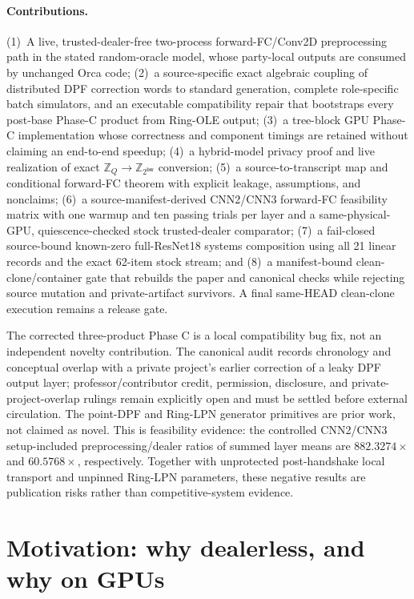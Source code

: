 \documentclass[11pt]{article}
\newcommand{\Z}{\mathbb{Z}}
\newcommand{\bw}{\mathsf{bw}}
\begin{document}
\paragraph{Contributions.}
(1)~A live, trusted-dealer-free two-process forward-FC/Conv2D preprocessing
path in the stated random-oracle model, whose party-local outputs are consumed
by unchanged Orca code;
(2)~a source-specific exact algebraic coupling of distributed DPF correction
words to standard generation, complete role-specific batch simulators, and an
executable compatibility repair that bootstraps every post-base Phase-C product
from Ring-OLE output;
(3)~a tree-block GPU Phase-C implementation whose correctness and component
timings are retained without claiming an end-to-end speedup;
(4)~a hybrid-model privacy proof and live realization of exact
$\Z_Q\to\Z_{2^\bw}$ conversion;
(5)~a source-to-transcript map and conditional forward-FC theorem with explicit
leakage, assumptions, and nonclaims;
(6)~a source-manifest-derived CNN2/CNN3 forward-FC feasibility matrix with one
warmup and ten passing trials per layer and a same-physical-GPU,
quiescence-checked stock trusted-dealer comparator;
(7)~a fail-closed source-bound known-zero full-ResNet18 systems composition
using all 21 linear records and the exact 62-item stock stream; and
(8)~a manifest-bound clean-clone/container gate that rebuilds the paper and
canonical checks while rejecting source mutation and private-artifact
survivors. A final same-HEAD clean-clone execution remains a release gate.

The corrected three-product Phase C is a local compatibility bug fix, not an
independent novelty contribution. The canonical audit records chronology and
conceptual overlap with a private project's earlier correction of a leaky DPF
output layer; professor/contributor credit, permission, disclosure, and
private-project-overlap rulings remain explicitly open and must be settled
before external circulation. The point-DPF and Ring-LPN generator primitives
are prior work, not claimed as novel. This is feasibility evidence: the
controlled CNN2/CNN3 setup-included preprocessing/dealer ratios of summed
layer means are $882.3274\times$ and $60.5768\times$, respectively.
Together with unprotected post-handshake local transport and unpinned Ring-LPN
parameters, these negative results are publication risks rather than
competitive-system evidence.
\section{Motivation: why dealerless, and why on GPUs}
\label{sec:motivation}
\end{document}
